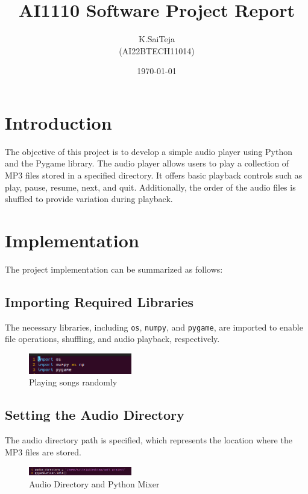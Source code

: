 \documentclass[journal,12pt,twocolumn]{IEEEtran}
\title{AI1110 Software Project Report}
\author{K.SaiTeja\\ (AI22BTECH11014)}
\date{\today}
\begin{document}
\maketitle

\section{Introduction}
The objective of this project is to develop a simple audio player using Python and the Pygame library. The audio player allows users to play a collection of MP3 files stored in a specified directory. It offers basic playback controls such as play, pause, resume, next, and quit. Additionally, the order of the audio files is shuffled to provide variation during playback.

\section{Implementation}
The project implementation can be summarized as follows:

\subsection{Importing Required Libraries}
The necessary libraries, including \texttt{os}, \texttt{numpy}, and \texttt{pygame}, are imported to enable file operations, shuffling, and audio playback, respectively.
\begin{figure}[h]
    \centering
    \includegraphics[width = 0.4\textwidth]{figs/fig1.png}
    \caption{Playing songs randomly}
    \label{fig:my_label}
\end{figure}

\subsection{Setting the Audio Directory}
The audio directory path is specified, which represents the location where the MP3 files are stored.
\begin{figure}[h]
    \centering
    \includegraphics[width = 0.4\textwidth]{figs/fig2.png}
    \caption{Audio Directory and Python Mixer} 
    \label{fig:my_label}
\end{figure}
\end{document}
